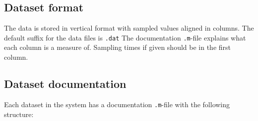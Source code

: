 \documentclass[10pt,a4paper]{article}   %
\begin{document}
\subsection{Dataset format}
The data is stored in vertical format with sampled values aligned  in
columns. The default suffix for the data files is \verb+.dat+
The documentation \verb+.m+-file explains what each column is a measure of.
Sampling times if given should be in the first column.



\subsection{Dataset documentation}
Each dataset in the system has a documentation \verb+.m+-file with the following structure:
\end{document}
